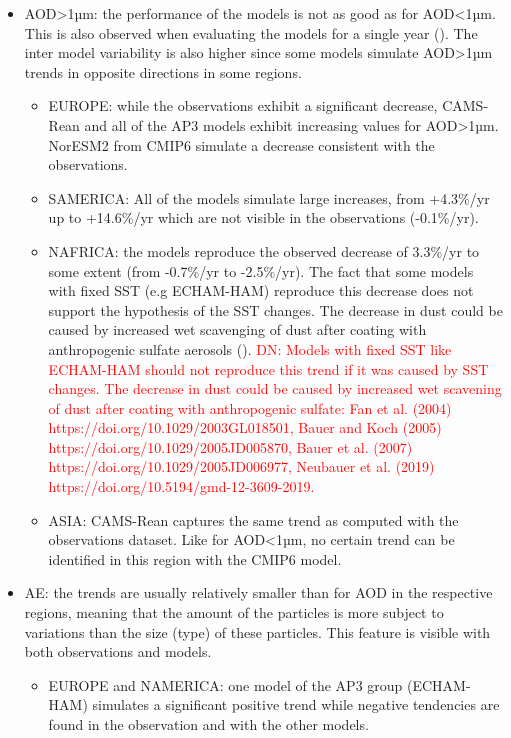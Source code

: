 \documentclass[journal abbreviation, manuscript]{copernicus}
\begin{document}
\begin{itemize}
\begin{itemize}
       \end{itemize}
 \item AOD>1µm: the performance of the models is not as good as for AOD<1µm. This is also observed when evaluating the models for a single year (\cite{jonaseval}). The inter model variability is also higher since some models simulate AOD>1µm trends in opposite directions in some regions.
       \begin{itemize}
        \item EUROPE: while the observations exhibit a significant decrease, CAMS-Rean and all of the AP3 models exhibit increasing values for AOD>1µm. NorESM2 from CMIP6 simulate a decrease consistent with the observations.
        \item SAMERICA: All of the models simulate large increases, from +4.3\%/yr up to +14.6\%/yr  which are not visible in the observations (-0.1\%/yr).
        \item NAFRICA: the models reproduce the observed decrease of 3.3\%/yr to some extent (from -0.7\%/yr to -2.5\%/yr). The fact that some 
        models with fixed SST (e.g ECHAM-HAM) reproduce this decrease does not support the hypothesis of the SST changes. The decrease in dust could be caused by increased wet scavenging of dust after coating with anthropogenic sulfate aerosols ().
        \textcolor{red}{DN: Models with fixed SST like ECHAM-HAM should not reproduce this trend if it was caused by SST changes. The decrease in dust could be caused by increased wet scavening of dust after coating with anthropogenic sulfate: Fan et al. (2004) https://doi.org/10.1029/2003GL018501, Bauer and Koch (2005)  https://doi.org/10.1029/2005JD005870, Bauer et al. (2007)  https://doi.org/10.1029/2005JD006977, Neubauer et al. (2019) https://doi.org/10.5194/gmd-12-3609-2019.}
        \item ASIA: CAMS-Rean captures the same trend as computed with the observations dataset. Like for AOD<1µm, no certain trend can be identified  in this region with the CMIP6 model.
       \end{itemize}
 \item AE: the trends are usually relatively smaller than for AOD in the respective regions, meaning that the amount of the particles is more subject to variations than the size (type) of these particles. This feature is visible with both observations and models.
       \begin{itemize}
        \item EUROPE and NAMERICA: one model of the AP3 group (ECHAM-HAM) simulates a significant positive trend while negative tendencies are found in the observation and with the other models.

\end{itemize}
\end{itemize}
\end{document}
